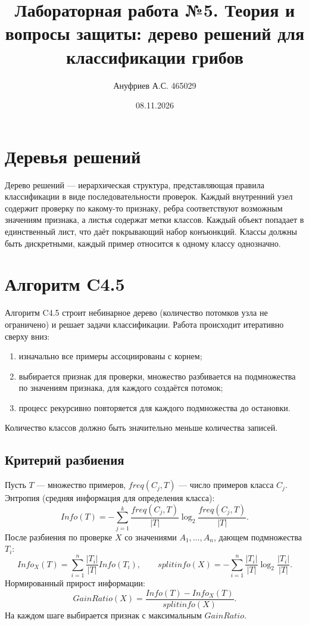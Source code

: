 \documentclass[12pt,a4paper]{article}
\title{Лабораторная работа №5. Теория и вопросы защиты: дерево решений для классификации грибов}
\author{Ануфриев А.С. 465029}
\date{08.11.2026}
\begin{document}
\maketitle

\section{Деревья решений}
Дерево решений --- иерархическая структура, представляющая правила классификации в виде последовательности проверок. Каждый внутренний узел содержит проверку по какому-то признаку, ребра соответствуют возможным значениям признака, а листья содержат метки классов. Каждый объект попадает в единственный лист, что даёт покрывающий набор конъюнкций. Классы должны быть дискретными, каждый пример относится к одному классу однозначно.

\section{Алгоритм C4.5}
Алгоритм C4.5 строит небинарное дерево (количество потомков узла не ограничено) и решает задачи классификации. Работа происходит итеративно сверху вниз:
\begin{enumerate}
\item изначально все примеры ассоциированы с корнем;
\item выбирается признак для проверки, множество разбивается на подмножества по значениям признака, для каждого создаётся потомок;
\item процесс рекурсивно повторяется для каждого подмножества до остановки.
\end{enumerate}
Количество классов должно быть значительно меньше количества записей.

\subsection{Критерий разбиения}
Пусть $T$ --- множество примеров, $freq(C_j,T)$ --- число примеров класса $C_j$. Энтропия (средняя информация для определения класса):
\[
Info(T) = -\sum_{j=1}^{k} \frac{freq(C_j,T)}{|T|} \log_2 \frac{freq(C_j,T)}{|T|}.
\]
После разбиения по проверке $X$ со значениями $A_1,\dots,A_n$, дающем подмножества $T_i$:
\[
Info_X(T) = \sum_{i=1}^{n} \frac{|T_i|}{|T|} Info(T_i), \qquad
splitinfo(X) = -\sum_{i=1}^{n} \frac{|T_i|}{|T|} \log_2 \frac{|T_i|}{|T|}.
\]
Нормированный прирост информации:
\[
GainRatio(X) = \frac{Info(T) - Info_X(T)}{splitinfo(X)}.
\]
На каждом шаге выбирается признак с максимальным $GainRatio$.
\end{document}
